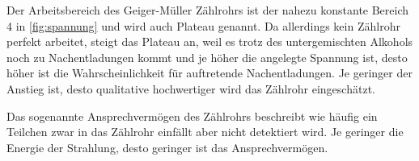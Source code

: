 Der Arbeitsbereich des Geiger-Müller Zählrohrs ist der nahezu konstante Bereich 4 in \autoref{fig:spannung} und wird auch Plateau genannt. 
Da allerdings kein Zählrohr perfekt arbeitet, steigt das Plateau an, weil es trotz des untergemischten Alkohols noch zu Nachentladungen kommt und je höher die angelegte Spannung ist, desto höher ist die Wahrscheinlichkeit für auftretende Nachentladungen.
Je geringer der Anstieg ist, desto qualitative hochwertiger wird das Zählrohr eingeschätzt.

Das sogenannte Ansprechvermögen des Zählrohrs beschreibt wie häufig ein Teilchen zwar in das Zählrohr einfällt aber nicht detektiert wird.
Je geringer die Energie der Strahlung, desto geringer ist das Ansprechvermögen.